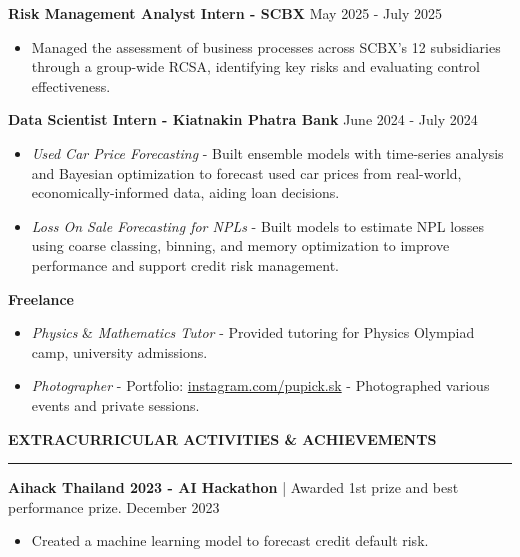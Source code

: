 \documentclass[a4paper, 11pt]{article}
\begin{document}
\textbf{Risk Management Analyst Intern - SCBX} \hfill May 2025 - July 2025
\begin{itemize}[noitemsep, topsep=0pt, partopsep=0pt, parsep=0pt, leftmargin=20pt]
    \item Managed the assessment of business processes across SCBX’s 12 subsidiaries through a group-wide RCSA, identifying key risks and evaluating control effectiveness.
\end{itemize}

\textbf{Data Scientist Intern - Kiatnakin Phatra Bank} \hfill June 2024 - July 2024
\begin{itemize}[noitemsep, topsep=0pt, partopsep=0pt, parsep=0pt, leftmargin=20pt]
    \item \textit{Used Car Price Forecasting} - Built ensemble models with time-series analysis and Bayesian optimization to forecast used car prices from real-world, economically-informed data, aiding loan decisions.
    \item \textit{Loss On Sale Forecasting for NPLs} - Built models to estimate NPL losses using coarse classing, binning, and memory optimization to improve performance and support credit risk management.
\end{itemize}

\textbf{Freelance}
\begin{itemize}[noitemsep, topsep=0pt, partopsep=0pt, parsep=0pt, leftmargin=20pt]
    \item \textit{Physics} \& \textit{Mathematics Tutor} - Provided tutoring for Physics Olympiad camp, university admissions.
    \item \textit{Photographer} - Portfolio: \href{https://www.instagram.com/pupick.sk/}{instagram.com/pupick.sk} - Photographed various events and private sessions.
\end{itemize}

\vspace{6pt}
\textbf{EXTRACURRICULAR ACTIVITIES \& ACHIEVEMENTS}
\vspace{5pt}
{\hrule}
\vspace{6pt}

\textbf{Aihack Thailand 2023 - AI Hackathon} | Awarded 1st prize and best performance prize. \hfill December 2023
\begin{itemize}[noitemsep, topsep=0pt, partopsep=0pt, parsep=0pt, leftmargin=20pt]
    \item Created a machine learning model to forecast credit default risk.
\end{itemize}
\vspace{3pt}
\end{document}
